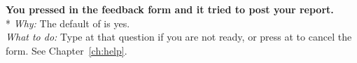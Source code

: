 {\bfseries You pressed  in the feedback form and it tried to post
your report.}\\*
\emph{Why:} The default of  is yes.\\
\emph{What to do:} Type  at that question if you are not ready, or
press  at  to cancel the form. See
Chapter~\ref{ch:help}.
